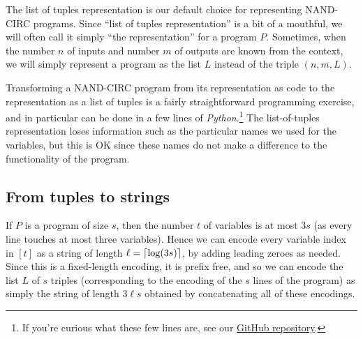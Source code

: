 The list of tuples representation is our default choice for representing
NAND-CIRC programs. Since ``list of tuples representation'' is a bit of
a mouthful, we will often call it simply ``the representation'' for a
program \(P\). Sometimes, when the number \(n\) of inputs and number
\(m\) of outputs are known from the context, we will simply represent a
program as the list \(L\) instead of the triple \((n,m,L)\).

\hypertarget{representXOR}{}

Transforming a NAND-CIRC program from its representation as code to the
representation as a list of tuples is a fairly straightforward
programming exercise, and in particular can be done in a few lines of
\emph{Python}.\footnote{If you're curious what these few lines are, see
  our \href{https://github.com/boazbk/tcscode}{GitHub repository}.} The
list-of-tuples representation loses information such as the particular
names we used for the variables, but this is OK since these names do not
make a difference to the functionality of the program.

\subsection{From tuples to
strings}\label{stringrepresentationrpgoramsec}

If \(P\) is a program of size \(s\), then the number \(t\) of variables
is at most \(3s\) (as every line touches at most three variables). Hence
we can encode every variable index in \([t]\) as a string of length
\(\ell = \lceil \log (3s) \rceil\), by adding leading zeroes as needed. Since
this is a fixed-length encoding, it is prefix free, and so we can encode
the list \(L\) of \(s\) triples (corresponding to the encoding of the
\(s\) lines of the program) as simply the string of length \(3\ell s\)
obtained by concatenating all of these encodings.

